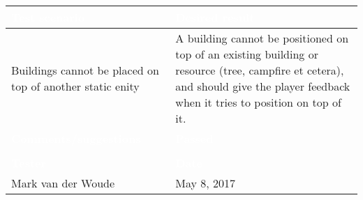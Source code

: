 \begin{tabularx}{\textwidth}{|X|X|}
\hline
\rowcolor{lightgray}\textcolor{white}{\textbf{Test scenario}} &
\textcolor{white}{\textbf{Desired result}}       
\\\hline
Buildings cannot be placed on top of another static enity &
A building cannot be positioned on top of an existing building or resource (tree, campfire et cetera), and should give the player feedback when it tries to position on top of it.
\\\hline
\rowcolor{lightgray}\textcolor{white}{\textbf{Comments/suggestions}} & 
\textcolor{white}{\textbf{Passed}}
\\\hline
 & \cellcolor{green}                       
\\\hline
\rowcolor{lightgray}\textcolor{white}{\textbf{Tester}} & \cellcolor{lightgray}\textcolor{white}{\textbf{Date}}               
\\\hline
Mark van der Woude & May 8, 2017                               		 
\\\hline
\end{tabularx}